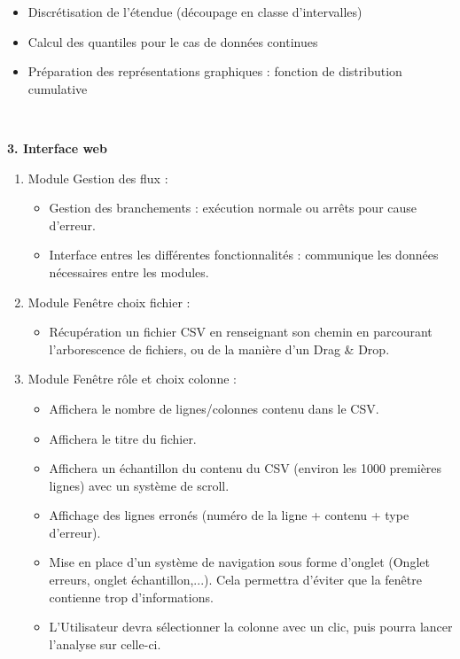 \begin{description}[style=unboxed,leftmargin=0.2cm]
\begin{enumerate}
					\begin{itemize}
					\item Discrétisation de l'étendue (découpage en classe d'intervalles)
					\item Calcul des quantiles pour le cas  de données continues
					\item Préparation des représentations graphiques : fonction de distribution cumulative
					\end{itemize}
			\end{enumerate}
			~\\
			\item\textbf{3. Interface web}
			\begin{enumerate}
				\item Module Gestion des flux :
					\begin{itemize}
					\item Gestion des branchements : exécution normale ou arrêts pour cause d'erreur.
					\item Interface entres les différentes fonctionnalités : communique les données nécessaires entre les modules.
					\end{itemize}
					
				\item Module Fenêtre choix fichier :
					\begin{itemize}
					\item Récupération un fichier CSV en renseignant son chemin en parcourant l'arborescence de fichiers, ou de la manière d'un Drag \& Drop.
					\end{itemize}
					
				\item Module Fenêtre rôle et choix colonne :
					\begin{itemize}
					\item Affichera le nombre de lignes/colonnes contenu dans le CSV.
					\item Affichera le titre du fichier.
					\item Affichera un échantillon du contenu du CSV (environ les 1000 premières lignes) avec un système de scroll.
					\item Affichage des lignes erronés (numéro de la ligne + contenu + type d'erreur).
					\item Mise en place d'un système de navigation sous forme d'onglet (Onglet erreurs, onglet échantillon,...). Cela permettra d'éviter que la fenêtre contienne trop d'informations.
					\item L'Utilisateur devra sélectionner la colonne avec un clic, puis pourra lancer l'analyse sur celle-ci. 
					\end{itemize}
				

\end{enumerate}
\end{description}
